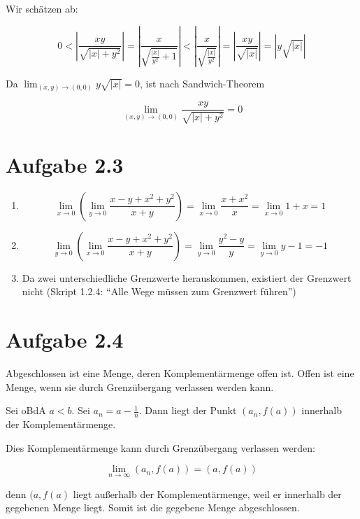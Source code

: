 \documentclass[a4paper,german,12pt,smallheadings]{scrartcl}
\begin{document}
Wir schätzen ab:

\begin{equation*}
  0 <
  \left| \frac{xy}{\sqrt{|x| + y^2}}          \right| =
  \left| \frac{x}{\sqrt{\frac{|x|}{y^2} + 1}} \right| <
  \left| \frac{x}{\sqrt{\frac{|x|}{y^2}}}     \right| =
  \left| \frac{xy}{\sqrt{|x|}}                \right| =
  \left| y\sqrt{|x|}                          \right|
\end{equation*}

Da $\lim_{(x,y) \to (0,0)} y\sqrt{|x|} = 0$, ist nach Sandwich-Theorem

\begin{equation*}
  \lim_{(x,y) \to (0,0)} \frac{xy}{\sqrt{|x| + y^2}} = 0
\end{equation*}

\section*{Aufgabe 2.3}

\begin{enumerate}[(1)]
  \item
    \begin{equation*}
      \lim_{x \to 0} \left( \lim_{y \to 0} \frac{x-y+x^2+y^2}{x+y} \right) =
      \lim_{x \to 0} \frac{x+x^2}{x}  =
      \lim_{x \to 0} 1+x =
      1
    \end{equation*}
  \item
    \begin{equation*}
      \lim_{y \to 0} \left( \lim_{x \to 0} \frac{x-y+x^2+y^2}{x+y} \right) =
      \lim_{y \to 0} \frac{y^2-y}{y} =
      \lim_{y \to 0} y-1 =
      -1
    \end{equation*}
  \item
    Da zwei unterschiedliche Grenzwerte herauskommen, existiert der Grenzwert
    nicht (Skript 1.2.4: ``Alle Wege müssen zum Grenzwert führen'')
\end{enumerate}

\section*{Aufgabe 2.4}

Abgeschlossen ist eine Menge, deren Komplementärmenge offen ist. Offen ist eine
Menge, wenn sie durch Grenzübergang verlassen werden kann.

Sei oBdA $a < b$. Sei $a_n = a - \frac{1}{n}$. Dann liegt der Punkt $(a_n,
f(a))$ innerhalb der Komplementärmenge.

Dies Komplementärmenge kann durch Grenzübergang verlassen werden:

\begin{equation}
  \lim_{n \to \infty} (a_n, f(a)) = (a, f(a))
\end{equation}

denn $(a, f(a)$ liegt außerhalb der Komplementärmenge, weil er innerhalb der
gegebenen Menge liegt. Somit ist die gegebene Menge abgeschlossen.
\end{document}
